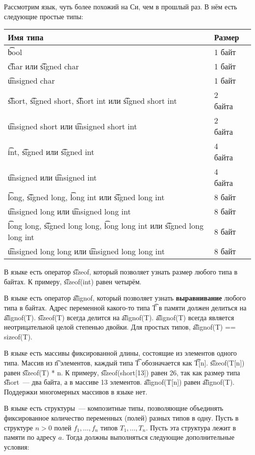 Рассмотрим язык, чуть более похожий на Си, чем в прошлый раз.
В нём есть следующие простые типы:

\vspace*{1em}
\begin{tabular}{|l|l|l|}
Имя типа & Размер \\ \hline
\t{bool} & 1 байт \\
\t{char} или \t{signed char} & 1 байт \\
\t{unsigned char} & 1 байт \\
\t{short}, \t{signed short}, \t{short int} или \t{signed short int} & 2 байта \\
\t{unsigned short} или \t{unsigned short int} & 2 байта \\
\t{int}, \t{signed} или \t{signed int} & 4 байта \\
\t{unsigned} или \t{unsigned int} & 4 байта \\
\t{long}, \t{signed long}, \t{long int} или \t{signed long int} & 8 байт \\
\t{unsigned long} или \t{unsigned long int} & 8 байт \\
\t{long long}, \t{signed long long}, \t{long long int} или \t{signed long long int} & 8 байт \\
\t{unsigned long long} или \t{unsigned long long int} & 8 байт \\
\end{tabular}
\vspace*{1em}

В языке есть оператор \t{sizeof}, который позволяет узнать размер любого типа в байтах.
К примеру, \t{sizeof(int)} равен четырём.

В языке есть оператор \t{alignof}, который позволяет узнать {\bf выравнивание} любого типа в байтах.
Адрес переменной какого-то типа \t{T} в памяти должен делиться на \t{alignof(T)}.
\t{sizeof(T)} всегда делится на \t{alignof(T)}.
\t{alignof(T)} всегда является неотрицательной целой степенью двойки.
Для простых типов, \t{alignof(T) == sizeof(T)}. 

В языке есть массивы фиксированной длины, состоящие из элементов одного типа.
Массив из \t{n} элементов, каждый типа \t{T} обозначается как \t{T[n]}.
\t{sizeof(T[n])} равен \t{sizeof(T) * n}. К примеру, \t{sizeof(short[13])} равен 26,
так как размер типа \t{short}~--- два байта, а в массиве 13 элементов.
\t{alignof(T[n])} равен \t{alignof(T)}. Поддержки многомерных массивов в языке нет.

В языке есть структуры~--- композитные типы, позволяющие объединять фиксированное количество переменных (полей) разных типов в одну.
Пусть в структуре $n > 0$ полей $f_1, \ldots, f_n$ типов $T_1, \ldots, T_n$.
Пусть эта структура лежит в памяти по адресу $a$.
Тогда должны выполняться следующие дополнительные условия:

